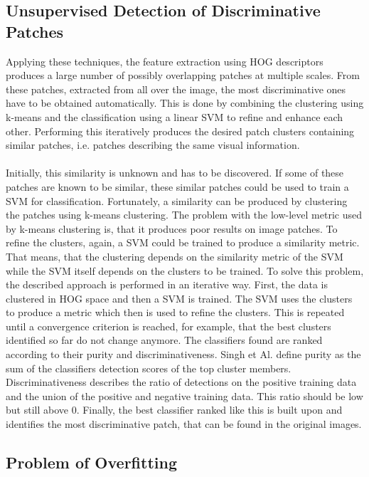 \subsection{Unsupervised Detection of Discriminative Patches}

Applying these techniques, the feature extraction using HOG descriptors produces a large number of possibly overlapping patches at multiple scales. From these patches, extracted from all over the image, the most discriminative ones have to be obtained automatically. This is done by combining the clustering using k-means and the classification using a linear SVM to refine and enhance each other. Performing this iteratively produces the desired patch clusters containing similar patches, i.e. patches describing the same visual information. 
\\
\\
Initially, this similarity is unknown and has to be discovered. If some of these patches are known to be similar, these similar patches could be used to train a SVM for classification. Fortunately, a similarity can be produced by clustering the patches using k-means clustering. The problem with the low-level metric used by k-means clustering is, that it produces poor results on image patches. To refine the clusters, again, a SVM could be trained to produce a similarity metric. That means, that the clustering depends on the similarity metric of the SVM while the SVM itself depends on the clusters to be trained. To solve this problem, the described approach is performed in an iterative way. First, the data is clustered in HOG space and then a SVM is trained. The SVM uses the clusters to produce a metric which then is used to refine the clusters. This is repeated until a convergence criterion is reached, for example, that the best clusters identified so far do not change anymore. The classifiers found are ranked according to their purity and discriminativeness. Singh et Al. \cite{Singh2012DiscPat} define purity as the sum of the classifiers detection scores of the top cluster members. Discriminativeness describes the ratio of detections on the positive training data and the union of the positive and negative training data. This ratio should be low but still above 0. Finally, the best classifier ranked like this is built upon and identifies the most discriminative patch, that can be found in the original images.

\subsection{Problem of Overfitting}

